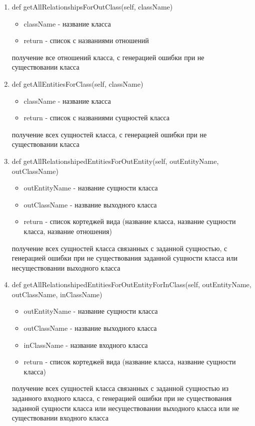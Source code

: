 \documentclass{article}
\begin{document}
\begin{enumerate}
	\item def getAllRelationshipsForOutClass(self, className)
	\begin{itemize}
		\item className - название класса
		\item return - список с названиями отношений
	\end{itemize}
	получение все отношений класса, с генерацией ошибки при не существовании класса
	
	\item def getAllEntitiesForClass(self, className)
	\begin{itemize}
		\item className - название класса
		\item return - список с названиями сущностей класса
	\end{itemize}
	получение всех сущностей класса, с генерацией ошибки при не существовании класса
	
	\item def getAllRelationshipedEntitiesForOutEntity(self, outEntityName, outClassName)
	\begin{itemize}
		\item outEntityName - название сущности класса
		\item outClassName - название выходного класса
		\item return - список кортеджей вида (название класса, название сущности класса, название отношения)
	\end{itemize}
	получение всех сущностей класса связанных с заданной сущностью, с генерацией ошибки при не существования заданной сущности класса или несуществовании выходного класса
	
	\item def getAllRelationshipedEntitiesForOutEntityForInClass(self, outEntityName, outClassName, inClassName)
	\begin{itemize}
		\item outEntityName - название сущности класса
		\item outClassName - название выходного класса
		\item inClassName - название входного класса
		\item return - список кортеджей вида (название класса, название сущности класса)
	\end{itemize}
	получение всех сущностей класса связанных с заданной сущностью из заданного входного класса, с генерацией ошибки при не существования заданной сущности класса или несуществовании выходного класса или не существовании входного класса
	

\end{enumerate}
\end{document}
